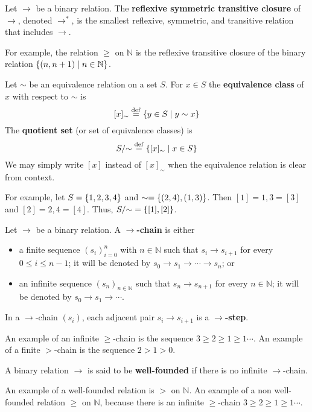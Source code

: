 \begin{definition} 
    \label{def:binary_relation:closure}
    Let \( \to \) be a binary relation.
    The \textbf{reflexive symmetric transitive closure} of $\to$, denoted $\to^*$, is the smallest reflexive, symmetric, and transitive relation that includes \( \to \).
\end{definition}
For example, 
the relation \(\geq\) on \(\mathbb{N}\) is the reflexive transitive closure of the binary relation \(\{(n, n+1) \mid n \in \mathbb{N}\}\).

\begin{definition}
   Let \(\sim\) be an equivalence relation on a set \(S\). For \(x\in S\) the \textbf{equivalence class} of \(x\) with respect to \(\sim\) is 
   \[[x]_{\sim} \overset{\operatorname{def}}{=} \{y\in S \mid y \sim x\}\]
   The \textbf{quotient set} (or set of equivalence classes) is 
   \[S/{\sim} \overset{\operatorname{def}}{=} \{[x]_{\sim} \mid x\in S\}\]
   We may simply write \([x]\) instead of \([x]_{\sim}\) when the equivalence relation is clear from context.
\end{definition}
For example, let $S = \{1,2,3,4\}$ and $\sim = \{(2,4),(1,3)\}$. Then $[1] = {1,3} = [3]$ and $[2] = {2,4} = [4]$. Thus, $S/{\sim} = \{[1],[2]\}$.


\begin{definition}
    \label{def:binary_relation:chain} 
    Let \(\to\) be a binary relation. 
    A \textbf{\(\to\)-chain} is either
      \begin{itemize}
          \item a finite sequence \((s_i)_{i=0}^n\) with \(n \in \mathbb{N}\) such that \(s_i \to s_{i+1}\) for every \(0 \leq i \leq n-1\); it will be denoted by \(s_0 \to s_1 \to \cdots \to s_n\); or
          \item an infinite sequence \((s_n)_{n \in \mathbb{N}}\) such that \(s_n \to s_{n+1}\) for every \(n \in \mathbb{N}\); it will be denoted by \(s_0 \to s_1 \to \cdots\).
      \end{itemize}
      In a \(\to\)-chain \((s_i)\), each adjacent pair \(s_i \to s_{i+1}\) is a \textbf{\(\to\)-step}.
\end{definition}
An example of an infinite \(\geq\)-chain is the sequence \(3 \geq 2 \geq 1 \geq 1 \cdots\). An example of a finite \(>\)-chain is the sequence \(2 > 1 > 0\).
\begin{definition} 
    \label{def:binary_relation:well_founded}
    A binary relation $\to$ is said to be \textbf{well-founded} if there is no infinite $\to$-chain. 
\end{definition}
An example of a well-founded relation is \(>\) on \(\mathbb{N}\). An example of a non well-founded relation \(\geq\) on \(\mathbb{N}\), because there is an infinite \(\geq\)-chain \(3 \geq 2 \geq 1 \geq 1 \cdots\).